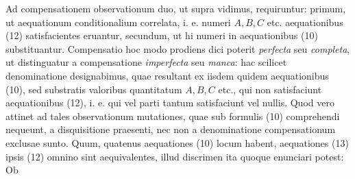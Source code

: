 Ad compensationem observationum duo, ut supra vidimus, requiruntur: primum, ut aequationum conditionalium correlata, i. e. numeri \(A,B,C\) etc. aequationibus (12) satisfacientes eruantur, secundum, ut hi numeri in aequationibus (10) substituantur. Compensatio hoc modo prodiens dici poterit \textit{perfecta} seu \textit{completa}, ut distinguatur a compensatione \textit{imperfecta} seu \textit{manca}: hac scilicet denominatione designabimus, quae resultant ex iisdem quidem aequationibus (10), sed substratis valoribus quantitatum \(A,B,C\) etc., qui non satisfaciunt aequationibus (12), i. e. qui vel parti tantum satisfaciunt vel nullis. Quod vero attinet ad tales observationum mutationes, quae sub formulis (10) comprehendi nequeunt, a disquisitione praesenti, nec non a denominatione compensationum exclusae sunto. Quum, quatenus aequationes (10) locum habent, aequationes (13) ipsis (12) omnino sint aequivalentes, illud discrimen ita quoque enunciari potest: Ob%
